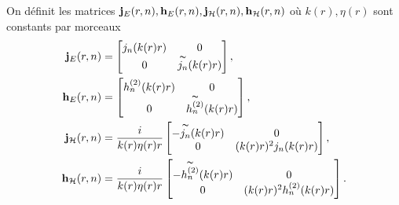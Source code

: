     \begin{defn}
      \label{def:sphere:je-jH-hE-hH}
      On définit les matrices \(\mathbf{j}_{E}(r,n),\mathbf{h}_{E}(r,n),\mathbf{j}_{\mathcal{H}}(r,n),\mathbf{h}_{\mathcal{H}}(r,n)\) où \(k(r),\eta(r)\) sont constants par morceaux
      \begin{align*}
        \mathbf{j}_{E}(r,n) &=
        \begin{bmatrix}
            j_n(k(r)r) & 0
            \\
            0 & \overset{\thicksim}{j_n}(k(r)r)
        \end{bmatrix},
        \\
        \mathbf{h}_{E}(r,n) &=
        \begin{bmatrix}
            h^{(2)}_n(k(r)r) & 0
            \\
            0 & \overset{\thicksim}{h^{(2)}_n}(k(r)r)
        \end{bmatrix},
        \\
        \mathbf{j}_{\mathcal{H}}(r,n) &=\dfrac{i}{k(r)\eta(r)r}
        \begin{bmatrix}
                -\overset{\thicksim}{j_n}(k(r)r) & 0
                \\
                0 & (k(r)r)^2 j_n(k(r)r)
        \end{bmatrix},
        \\
        \mathbf{h}_{\mathcal{H}}(r,n) &=\dfrac{i}{k(r)\eta(r)r}
        \begin{bmatrix}
                -\overset{\thicksim}{h^{(2)}_n}(k(r)r) & 0
                \\
                0 & (k(r)r)^2 h^{(2)}_n(k(r)r)
        \end{bmatrix}.
      \end{align*}
    \end{defn}

